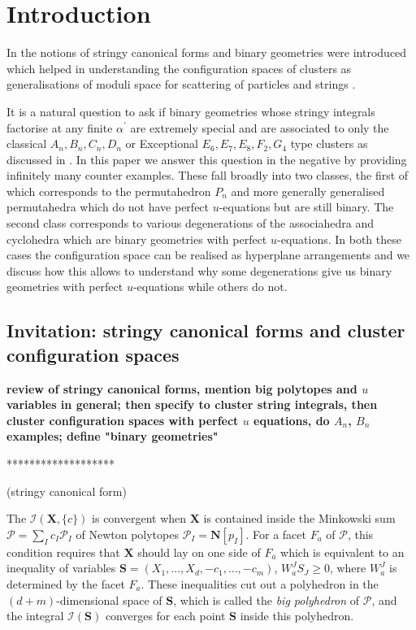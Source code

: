 \documentclass[hidelinks,12pt]{article}
\begin{document}
\vfill \eject



\baselineskip=18pt

\tableofcontents

\newpage
\section{Introduction}
In \cite{} the notions of stringy canonical forms and binary geometries were introduced which helped in understanding the configuration spaces of clusters as generalisations of moduli space for scattering of particles and strings . 

It is a natural question to ask if binary geometries whose stringy integrals factorise at any finite $\alpha^{'}$ are extremely special and are associated to only the classical $A_n, B_n, C_n,D_n$ or  Exceptional $E_6, E_7, E_8, F_2, G_4$  type clusters  as discussed in \cite{}. In this paper we answer this question in the negative by providing infinitely many counter examples. These fall broadly into two classes, the first of which corresponds to the permutahedron $P_n$ and more generally generalised permutahedra which do not have perfect $u$-equations but are still binary. The second class corresponds to various degenerations of the associahedra and cyclohedra which are binary geometries with perfect $u$-equations. In both these cases the configuration space can be realised as hyperplane arrangements and we discuss how this allows to understand why some degenerations give us binary geometries with perfect $u$-equations while others do not.

\subsection{Invitation: stringy canonical forms and cluster configuration spaces}

{\bf review of stringy canonical forms, mention big polytopes and $u$ variables in general; then specify to cluster string integrals, then cluster configuration spaces with perfect $u$ equations, do $A_n$, $B_n$ examples; define "binary geometries"}

*******************

(stringy canonical form)

The $\mathcal I(\mathbf X,\{c\})$ is convergent when $\mathbf X$ is contained inside
the Minkowski sum $\mathcal P=\sum_I c_I \mathcal P_I$ of Newton polytopes 
$\mathcal P_I=\mathbf N[p_I]$. For a facet $F_a$ of $\mathcal P$, this condition 
requires that $\mathbf X$ should lay on one side of $F_a$ which is equivalent to 
an inequality of variables $\mathbf S=(X_1,\dots,X_d,-c_1,\dots,-c_m)$, 
$W_a^JS_J\geq 0$, where $W_a^J$ is determined by the facet $F_a$. 
These inequalities cut out a polyhedron in the $(d+m)$-dimensional space of 
$\mathbf S$, which is called the \textit{big polyhedron} of $\mathcal P$, 
and the integral $\mathcal I(\mathbf S)$ converges for each point $\mathbf S$ 
inside this polyhedron.
\end{document}

